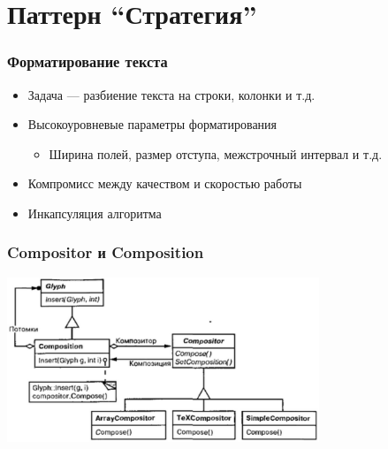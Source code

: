 \documentclass{../cscslides}
\begin{document}
    \section{Паттерн ``Стратегия''}

    \begin{frame}
        \frametitle{Форматирование текста}
        \begin{itemize}
            \item Задача --- разбиение текста на строки, колонки и т.д.
            \item Высокоуровневые параметры форматирования
            \begin{itemize}
                \item Ширина полей, размер отступа, межстрочный интервал и т.д.
            \end{itemize}
            \item Компромисс между качеством и скоростью работы
            \item Инкапсуляция алгоритма
        \end{itemize}
    \end{frame}

    \begin{frame}
        \frametitle{Compositor и Composition}
        \begin{center}
            \includegraphics[width=0.7\textwidth]{compositor.png}
        \end{center}
    \end{frame}
\end{document}
